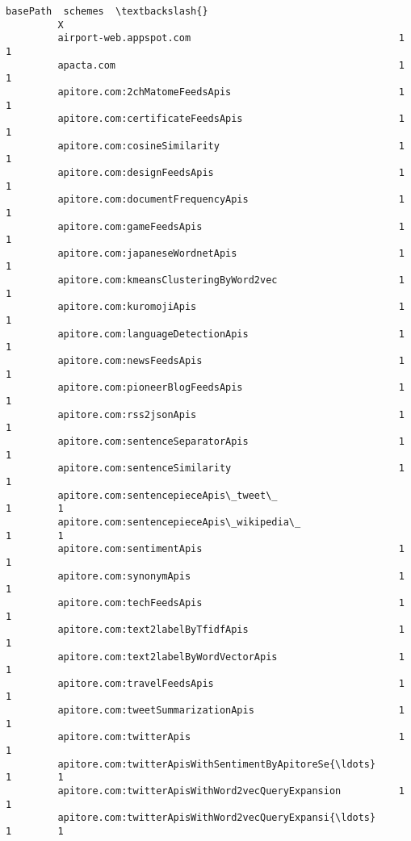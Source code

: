 \documentclass[11pt]{article}
\begin{document}
\begin{Verbatim}[commandchars=\\\{\}]
                                                             basePath  schemes  \textbackslash{}
         X                                                                       
         airport-web.appspot.com                                    1        1   
         apacta.com                                                 1        1   
         apitore.com:2chMatomeFeedsApis                             1        1   
         apitore.com:certificateFeedsApis                           1        1   
         apitore.com:cosineSimilarity                               1        1   
         apitore.com:designFeedsApis                                1        1   
         apitore.com:documentFrequencyApis                          1        1   
         apitore.com:gameFeedsApis                                  1        1   
         apitore.com:japaneseWordnetApis                            1        1   
         apitore.com:kmeansClusteringByWord2vec                     1        1   
         apitore.com:kuromojiApis                                   1        1   
         apitore.com:languageDetectionApis                          1        1   
         apitore.com:newsFeedsApis                                  1        1   
         apitore.com:pioneerBlogFeedsApis                           1        1   
         apitore.com:rss2jsonApis                                   1        1   
         apitore.com:sentenceSeparatorApis                          1        1   
         apitore.com:sentenceSimilarity                             1        1   
         apitore.com:sentencepieceApis\_tweet\_                       1        1   
         apitore.com:sentencepieceApis\_wikipedia\_                   1        1   
         apitore.com:sentimentApis                                  1        1   
         apitore.com:synonymApis                                    1        1   
         apitore.com:techFeedsApis                                  1        1   
         apitore.com:text2labelByTfidfApis                          1        1   
         apitore.com:text2labelByWordVectorApis                     1        1   
         apitore.com:travelFeedsApis                                1        1   
         apitore.com:tweetSummarizationApis                         1        1   
         apitore.com:twitterApis                                    1        1   
         apitore.com:twitterApisWithSentimentByApitoreSe{\ldots}         1        1   
         apitore.com:twitterApisWithWord2vecQueryExpansion          1        1   
         apitore.com:twitterApisWithWord2vecQueryExpansi{\ldots}         1        1   

\end{Verbatim}
\end{document}
